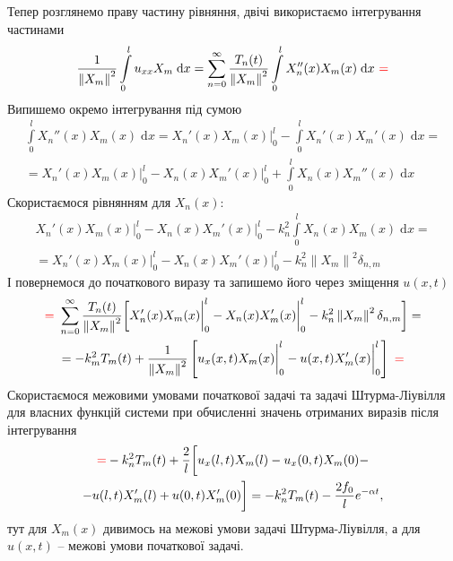 Тепер розглянемо праву частину рівняння, двічі використаємо інтегрування частинами
\begin{equation*}
    \frac{1}{\left\lVert X_m\right\rVert^2} \int\limits_0^l u_{xx} X_m \;\mathrm{d}x = \sum\limits_{n=0}^\infty \frac{T_n(t)}{\left\lVert X_m\right\rVert^2} \int\limits_0^l X_n''(x) X_m(x) \;\mathrm{d}x \  \textcolor{red}{=}
\end{equation*}
Випишемо окремо інтегрування під сумою
\begin{equation*}
    \begin{gathered}
        \int\limits_0^l X_n''(x) X_m(x) \;\mathrm{d}x = X_n'(x) X_m(x) \bigg|_0^l - \int\limits_0^l X_n'(x) X_m'(x) \;\mathrm{d}x = \\
        = X_n'(x) X_m(x) \bigg|_0^l - X_n(x) X_m'(x) \bigg|_0^l + \int\limits_0^l X_n(x) X_m''(x) \;\mathrm{d}x
    \end{gathered}
\end{equation*}
Скористаємося рівнянням для $X_n(x)$:
\begin{equation*}
    \begin{gathered}
        X_n'(x) X_m(x) \bigg|_0^l - X_n(x) X_m'(x) \bigg|_0^l - k_n^2 \int\limits_0^l X_n(x) X_m(x) \;\mathrm{d}x =\\
        = X_n'(x) X_m(x) \bigg|_0^l - X_n(x) X_m'(x) \bigg|_0^l - k_n^2 \left\lVert X_m\right\rVert^2 \delta_{n,m}
    \end{gathered}
\end{equation*}
І повернемося до початкового виразу та запишемо його через зміщення $u(x,t)$
\begin{equation*}
    \begin{gathered}
        \textcolor{red}{=}\ \sum\limits_{n=0}^\infty \frac{T_n(t)}{\left\lVert X_m\right\rVert^2} \bigg[X_n'(x) X_m(x) \bigg|_0^l - X_n(x) X_m'(x) \bigg|_0^l - k_n^2 \left\lVert X_m\right\rVert^2 \delta_{n,m}\bigg] =\\
        = - k_m^2 T_m(t) + \frac{1}{\left\lVert X_m\right\rVert^2} \left[ u_x(x,t) X_m(x) \bigg|_0^l - u(x,t) X_m'(x) \bigg|_0^l \right] \ \textcolor{red}{=}
    \end{gathered}
\end{equation*}
Скористаємося межовими умовами початкової задачі та задачі Штурма-Ліувілля для власних функцій системи при обчисленні значень отриманих виразів після інтегрування
\begin{equation*}
    \begin{gathered}
        \textcolor{red}{= } -k_n^2 T_m(t) + \frac{2}{l} \bigg[ u_x(l,t) X_m(l) - u_x(0,t) X_m(0) -\\
        - u(l,t) X_m'(l) + u(0,t) X_m'(0) \bigg] = - k_n^2 T_m(t) - \frac{2 f_0}{l} e^{-\alpha t},
    \end{gathered}
\end{equation*}
тут для $X_m(x)$ дивимось на межові умови задачі Штурма-Ліувілля, а для $u(x,t)$ -- межові умови початкової задачі.

